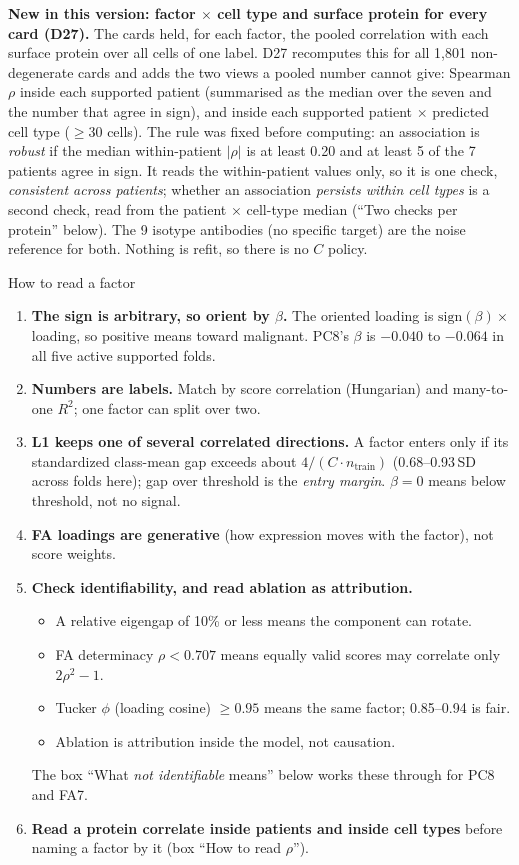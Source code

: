 \textbf{New in this version: factor $\times$ cell type and surface protein for every card (D27).} The cards held, for each factor, the pooled correlation with each surface protein over all cells of one label. D27 recomputes this for all 1,801 non-degenerate cards and adds the two views a pooled number cannot give: Spearman $\rho$ inside each supported patient (summarised as the median over the seven and the number that agree in sign), and inside each supported patient $\times$ predicted cell type ($\geq 30$ cells). The rule was fixed before computing: an association is \emph{robust} if the median within-patient $|\rho|$ is at least 0.20 and at least 5 of the 7 patients agree in sign. It reads the within-patient values only, so it is one check, \emph{consistent across patients}; whether an association \emph{persists within cell types} is a second check, read from the patient $\times$ cell-type median (``Two checks per protein'' below). The 9 isotype antibodies (no specific target) are the noise reference for both. Nothing is refit, so there is no $C$ policy.

\begin{explainbox}{How to read a factor}
\small
\begin{enumerate}[leftmargin=*,itemsep=0pt,topsep=0pt]
\item \textbf{The sign is arbitrary, so orient by $\beta$.} The oriented loading is $\mathrm{sign}(\beta)\times$loading, so positive means toward malignant. PC8's $\beta$ is $-0.040$ to $-0.064$ in all five active supported folds.
\item \textbf{Numbers are labels.} Match by score correlation (Hungarian) and many-to-one $R^2$; one factor can split over two.
\item \textbf{L1 keeps one of several correlated directions.} A factor enters only if its standardized class-mean gap exceeds about $4/(C\cdot n_{\text{train}})$ (0.68--0.93\,SD across folds here); gap over threshold is the \emph{entry margin}. $\beta=0$ means below threshold, not no signal.
\item \textbf{FA loadings are generative} (how expression moves with the factor), not score weights.
\item \textbf{Check identifiability, and read ablation as attribution.}
  \begin{itemize}[leftmargin=*,itemsep=0pt,topsep=0pt]
  \item A relative eigengap of 10\% or less means the component can rotate.
  \item FA determinacy $\rho<0.707$ means equally valid scores may correlate only $2\rho^2-1$.
  \item Tucker $\phi$ (loading cosine) $\geq 0.95$ means the same factor; 0.85--0.94 is fair.
  \item Ablation is attribution inside the model, not causation.
  \end{itemize}
  The box ``What \emph{not identifiable} means'' below works these through for PC8 and FA7.
\item \textbf{Read a protein correlate inside patients and inside cell types} before naming a factor by it (box ``How to read $\rho$'').
\end{enumerate}
\end{explainbox}

